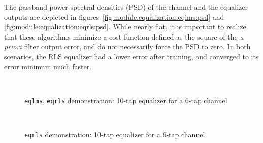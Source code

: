 The passband power spectral densities (PSD) of the channel and the equalizer outputs
are depicted in figures~\ref{fig:module:equalization:eqlms:psd} and \ref{fig:module:equalization:eqrls:psd}.
While nearly flat, it is important to realize that these algorithms minimize
a cost function defined as the square of the {\it a priori} filter output error,
and do not necessarily force the PSD to zero.
In both scenarios, the RLS equalizer had a lower error after training, and converged to its
error minimum much faster.



\begin{figure}[ht]
\centering
\mbox{
   \quad
   \quad
}
\mbox{
   \quad
   \quad
}
\caption{{\tt eqlms}, {\tt eqrls} demonstration:
10-tap equalizer for a 6-tap channel}
\label{fig:module:equalization:eqlms}
\end{figure}


\begin{figure}[ht]
\centering
\mbox{
  \subfigure[PSD] {
      \label{fig:module:equalization:eqrls:psd}
    } \quad
  \subfigure[constellation] {
      \label{fig:module:equalization:eqrls:constellation}
    } \quad
}
\mbox{
  \subfigure[taps] {
      \label{fig:module:equalization:eqrls:taps}
    } \quad
   \quad
}
\caption{{\tt eqrls} demonstration: 10-tap equalizer for a 6-tap channel}
\label{fig:module:equalization:eqrls}
\end{figure}


